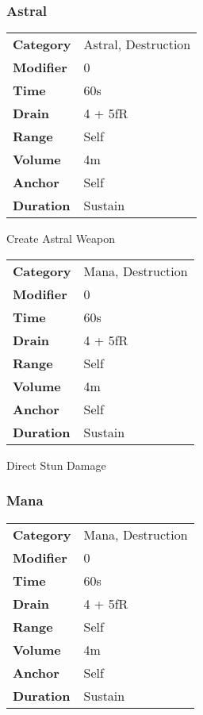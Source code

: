 \subsubsection{Astral}


\begin{tabular}{ll}
    \textbf{Category} & Astral, Destruction \\
    \textbf{Modifier} & 0                   \\
    \textbf{Time}     & 60s                 \\
    \textbf{Drain}    & 4 + 5fR             \\
    \textbf{Range}    & Self                \\
    \textbf{Volume}   & 4m                  \\
    \textbf{Anchor}   & Self                \\
    \textbf{Duration} & Sustain             \\
\end{tabular}

\hfil

Create Astral Weapon


\begin{tabular}{ll}
    \textbf{Category} & Mana, Destruction \\
    \textbf{Modifier} & 0                 \\
    \textbf{Time}     & 60s               \\
    \textbf{Drain}    & 4 + 5fR           \\
    \textbf{Range}    & Self              \\
    \textbf{Volume}   & 4m                \\
    \textbf{Anchor}   & Self              \\
    \textbf{Duration} & Sustain           \\
\end{tabular}

\hfil

Direct Stun Damage

\subsubsection{Mana}


\begin{tabular}{ll}
    \textbf{Category} & Mana, Destruction \\
    \textbf{Modifier} & 0                 \\
    \textbf{Time}     & 60s               \\
    \textbf{Drain}    & 4 + 5fR           \\
    \textbf{Range}    & Self              \\
    \textbf{Volume}   & 4m                \\
    \textbf{Anchor}   & Self              \\
    \textbf{Duration} & Sustain           \\
\end{tabular}

